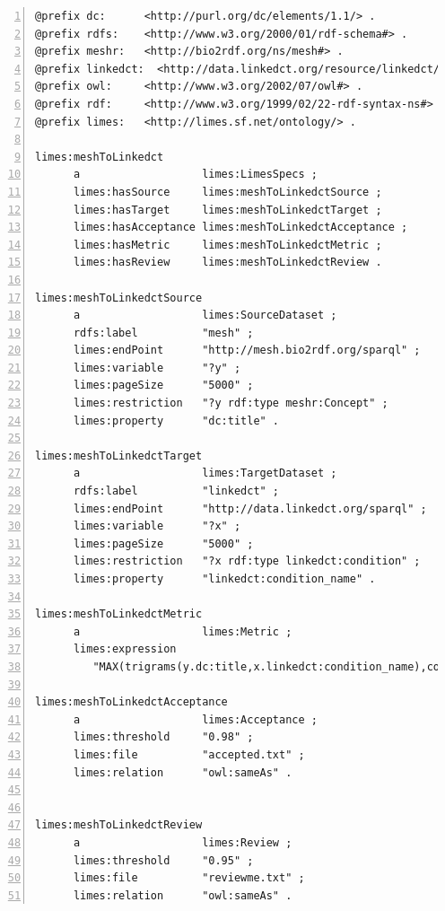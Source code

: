 \documentclass[a4paper, 11pt]{article}
\begin{document}
\begin{ttfamily}
\begin{lstlisting}[basicstyle=\scriptsize,numbers=left,numberstyle=\tiny, morekeywords={@prefix}]
@prefix dc:      <http://purl.org/dc/elements/1.1/> .
@prefix rdfs:    <http://www.w3.org/2000/01/rdf-schema#> .
@prefix meshr:   <http://bio2rdf.org/ns/mesh#> .
@prefix linkedct:  <http://data.linkedct.org/resource/linkedct/> .
@prefix owl:     <http://www.w3.org/2002/07/owl#> .
@prefix rdf:     <http://www.w3.org/1999/02/22-rdf-syntax-ns#> .
@prefix limes:   <http://limes.sf.net/ontology/> .

limes:meshToLinkedct
      a                   limes:LimesSpecs ;
      limes:hasSource     limes:meshToLinkedctSource ;
      limes:hasTarget     limes:meshToLinkedctTarget ;
      limes:hasAcceptance limes:meshToLinkedctAcceptance ;
      limes:hasMetric     limes:meshToLinkedctMetric ;
      limes:hasReview     limes:meshToLinkedctReview .

limes:meshToLinkedctSource
      a                   limes:SourceDataset ;
      rdfs:label          "mesh" ;
      limes:endPoint      "http://mesh.bio2rdf.org/sparql" ;
      limes:variable      "?y" ;
      limes:pageSize      "5000" ;
      limes:restriction   "?y rdf:type meshr:Concept" ;
      limes:property      "dc:title" .

limes:meshToLinkedctTarget
      a                   limes:TargetDataset ;
      rdfs:label          "linkedct" ;
      limes:endPoint      "http://data.linkedct.org/sparql" ;
      limes:variable      "?x" ;
      limes:pageSize      "5000" ;
      limes:restriction   "?x rdf:type linkedct:condition" ;
      limes:property      "linkedct:condition_name" .

limes:meshToLinkedctMetric
      a                   limes:Metric ;
      limes:expression
         "MAX(trigrams(y.dc:title,x.linkedct:condition_name),cosine(y.dc:title,x.linkedct:name))" .

limes:meshToLinkedctAcceptance
      a                   limes:Acceptance ;
      limes:threshold     "0.98" ;
      limes:file          "accepted.txt" ;
      limes:relation      "owl:sameAs" .


limes:meshToLinkedctReview
      a                   limes:Review ;
      limes:threshold     "0.95" ;
      limes:file          "reviewme.txt" ;
      limes:relation      "owl:sameAs" .

\end{lstlisting}
\end{ttfamily}
\end{document}
